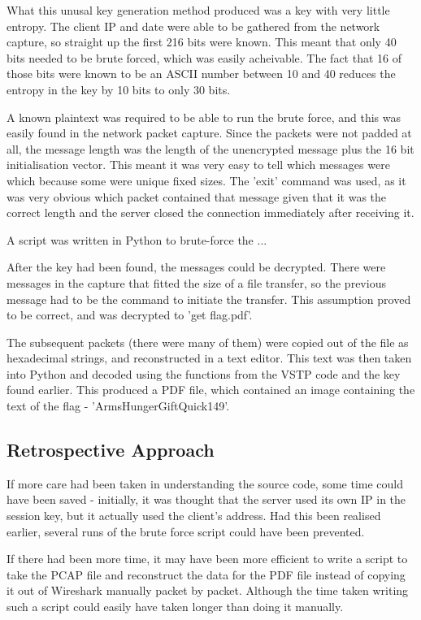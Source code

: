 What this unusal key generation method produced was a key with very little
entropy. The client IP and date were able to be gathered from the network
capture, so straight up the first 216 bits were known. This meant that
only 40 bits needed to be brute forced, which was easily acheivable. The
fact that 16 of those bits were known to be an ASCII number between 10
and 40 reduces the entropy in the key by 10 bits to only 30 bits.

A known plaintext was required to be able to run the brute force, and this
was easily found in the network packet capture. Since the packets were not
padded at all, the message length was the length of the unencrypted message
plus the 16 bit initialisation vector. This meant it was very easy to tell
which messages were which because some were unique fixed sizes. The 'exit'
command was used, as it was very obvious which packet contained that message
given that it was the correct length and the server closed the connection
immediately after receiving it.

A script was written in Python to brute-force the ...

After the key had been found, the messages could be decrypted. There were
messages in the capture that fitted the size of a file transfer, so the
previous message had to be the command to initiate the transfer. This
assumption proved to be correct, and was decrypted to 'get flag.pdf'.

The subsequent packets (there were many of them) were copied out of the file
as hexadecimal strings, and reconstructed in a text editor. This text was then
taken into Python and decoded using the functions from the VSTP code and the
key found earlier. This produced a PDF file, which contained an image containing
the text of the flag - 'ArmsHungerGiftQuick149'.

\subsection{Retrospective Approach}
If more care had been taken in understanding the source code, some time could
have been saved - initially, it was thought that the server used its own IP
in the session key, but it actually used the client's address. Had this been
realised earlier, several runs of the brute force script could have been
prevented.

If there had been more time, it may have been more efficient to write a
script to take the PCAP file and reconstruct the data for the PDF file
instead of copying it out of Wireshark manually packet by packet. Although
the time taken writing such a script could easily have taken longer than
doing it manually.

